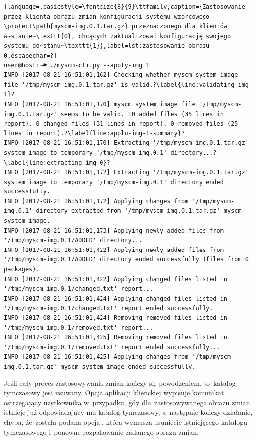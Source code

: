 \documentclass[thesis]{subfiles}
\begin{document}
\begin{lstlisting}[language=,basicstyle=\fontsize{8}{9}\ttfamily,caption={Zastosowanie przez klienta obrazu zmian konfiguracji systemu wzorcowego \protect\path{myscm-img.0.1.tar.gz} przeznaczonego dla klientów w~stanie~\texttt{0}, chcących zaktualizować konfigurację swojego systemu do~stanu~\texttt{1}},label=lst:zastosowanie-obrazu-0,escapechar=?]
user@host:~# ./myscm-cli.py --apply-img 1
INFO [2017-08-21 16:51:01,162] Checking whether myscm system image file '/tmp/myscm-img.0.1.tar.gz' is valid.?\label{line:validating-img-1}?
INFO [2017-08-21 16:51:01,170] myscm system image file '/tmp/myscm-img.0.1.tar.gz' seems to be valid. 10 added files (35 lines in report), 0 changed files (31 lines in report), 0 removed files (25 lines in report).?\label{line:applu-img-1-summary}?
INFO [2017-08-21 16:51:01,170] Extracting '/tmp/myscm-img.0.1.tar.gz' system image to temporary '/tmp/myscm-img.0.1' directory...?\label{line:extracting-img-0}?
INFO [2017-08-21 16:51:01,172] Extracting '/tmp/myscm-img.0.1.tar.gz' system image to temporary '/tmp/myscm-img.0.1' directory ended successfully.
INFO [2017-08-21 16:51:01,172] Applying changes from '/tmp/myscm-img.0.1' directory extracted from '/tmp/myscm-img.0.1.tar.gz' myscm system image.
INFO [2017-08-21 16:51:01,173] Applying newly added files from '/tmp/myscm-img.0.1/ADDED' directory...
INFO [2017-08-21 16:51:01,422] Applying newly added files from '/tmp/myscm-img.0.1/ADDED' directory ended successfully (files from 0 packages).
INFO [2017-08-21 16:51:01,422] Applying changed files listed in '/tmp/myscm-img.0.1/changed.txt' report...
INFO [2017-08-21 16:51:01,424] Applying changed files listed in '/tmp/myscm-img.0.1/changed.txt' report ended successfully.
INFO [2017-08-21 16:51:01,424] Removing removed files listed in '/tmp/myscm-img.0.1/removed.txt' report...
INFO [2017-08-21 16:51:01,425] Removing removed files listed in '/tmp/myscm-img.0.1/removed.txt' report ended successfully...
INFO [2017-08-21 16:51:01,425] Applying changes from '/tmp/myscm-img.0.1.tar.gz' myscm system image ended successfully.
\end{lstlisting}

Jeśli cały proces zastosowywania zmian kończy się powodzeniem, to~katalog tymczasowy jest usuwany. Opcja  aplikacji klienckiej wypisuje komunikat ostrzegający użytkownika w~przypadku, gdy dla~zastosowywanego obrazu zmian istnieje już odpowiadający mu katalog tymczasowy, a~następnie kończy działanie, chyba, że~została podana opcja , która wymusza usunięcie istniejącego katalogu tymczasowego i~ponowne rozpakowanie zadanego obrazu zmian.
\end{document}
